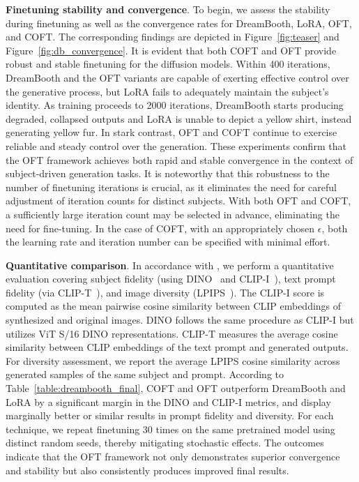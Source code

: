 \textbf{Finetuning stability and convergence}. To begin, we assess the stability during finetuning as well as the convergence rates for DreamBooth, LoRA, OFT, and COFT. The corresponding findings are depicted in Figure~\ref{fig:teaser} and Figure~\ref{fig:db_convergence}. It is evident that both COFT and OFT provide robust and stable finetuning for the diffusion models. Within 400 iterations, DreamBooth and the OFT variants are capable of exerting effective control over the generative process, but LoRA fails to adequately maintain the subject’s identity. As training proceeds to 2000 iterations, DreamBooth starts producing degraded, collapsed outputs and LoRA is unable to depict a yellow shirt, instead generating yellow fur. In stark contrast, OFT and COFT continue to exercise reliable and steady control over the generation. These experiments confirm that the OFT framework achieves both rapid and stable convergence in the context of subject-driven generation tasks. It is noteworthy that this robustness to the number of finetuning iterations is crucial, as it eliminates the need for careful adjustment of iteration counts for distinct subjects. With both OFT and COFT, a sufficiently large iteration count may be selected in advance, eliminating the need for fine-tuning. In the case of COFT, with an appropriately chosen $\epsilon$, both the learning rate and iteration number can be specified with minimal effort.

\textbf{Quantitative comparison}. In accordance with \cite{ruiz2023dreambooth}, we perform a quantitative evaluation covering subject fidelity (using DINO~\cite{caron2021emerging} and CLIP-I~\cite{radford2021learning}), text prompt fidelity (via CLIP-T~\cite{radford2021learning}), and image diversity (LPIPS~\cite{zhang2018unreasonable}). The CLIP-I score is computed as the mean pairwise cosine similarity between CLIP embeddings of synthesized and original images. DINO follows the same procedure as CLIP-I but utilizes ViT S/16 DINO representations. CLIP-T measures the average cosine similarity between CLIP embeddings of the text prompt and generated outputs. For diversity assessment, we report the average LPIPS cosine similarity across generated samples of the same subject and prompt. According to Table~\ref{table:dreambooth_final}, COFT and OFT outperform DreamBooth and LoRA by a significant margin in the DINO and CLIP-I metrics, and display marginally better or similar results in prompt fidelity and diversity. For each technique, we repeat finetuning 30 times on the same pretrained model using distinct random seeds, thereby mitigating stochastic effects. The outcomes indicate that the OFT framework not only demonstrates superior convergence and stability but also consistently produces improved final results.

